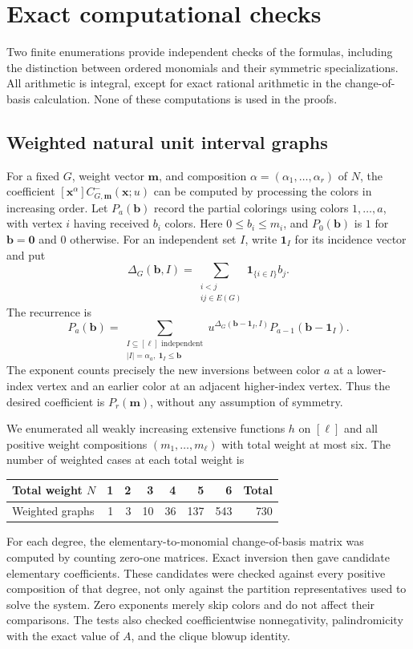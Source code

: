 \documentclass[11pt,reqno]{amsart}
\newcommand{\xx}{\mathbf x}
\newcommand{\mm}{\mathbf m}
\newcommand{\one}{\mathbf 1}
\theoremstyle{definition}
\theoremstyle{remark}
\numberwithin{equation}{section}
\begin{document}
\section{Exact computational checks}\label{app:checks}

Two finite enumerations provide independent checks of the formulas,
including the distinction between ordered monomials and their symmetric
specializations.  All arithmetic is integral, except for exact rational
arithmetic in the change-of-basis calculation.  None of these computations
is used in the proofs.

\subsection{Weighted natural unit interval graphs}
For a fixed $G$, weight vector $\mm$, and composition
$\alpha=(\alpha_1,\ldots,\alpha_r)$ of $N$, the coefficient
$[\xx^\alpha]C^-_{G,\mm}(\xx;u)$ can be computed by processing the colors
in increasing order.  Let $P_a(\mathbf b)$ record the partial colorings
using colors $1,\ldots,a$, with vertex $i$ having received $b_i$ colors.
Here $0\leq b_i\leq m_i$, and $P_0(\mathbf b)$ is $1$ for
$\mathbf b=\mathbf0$ and $0$ otherwise.  For an independent set $I$,
write $\one_I$ for its incidence vector and put
\[
 \Delta_G(\mathbf b,I)
  =\sum_{\substack{i<j\\ij\in E(G)}}\one_{\{i\in I\}}b_j.
\]
The recurrence is
\begin{equation}\label{eq:computational-recurrence}
 P_a(\mathbf b)
  =\sum_{\substack{I\subseteq[\ell]\text{ independent}\\
                   |I|=\alpha_a,\ \one_I\leq\mathbf b}}
       u^{\Delta_G(\mathbf b-\one_I,I)}
       P_{a-1}(\mathbf b-\one_I).
\end{equation}
The exponent counts precisely the new inversions between color $a$ at
a lower-index vertex and an earlier color at an adjacent higher-index
vertex.  Thus the desired coefficient is $P_r(\mm)$, without any
assumption of symmetry.

We enumerated all weakly increasing extensive functions $h$ on $[\ell]$
and all positive weight compositions $(m_1,\ldots,m_\ell)$ with total
weight at most six.  The number of weighted cases at each total weight is
\begin{center}
\begin{tabular}{lrrrrrrr}
\toprule
Total weight $N$ & 1 & 2 & 3 & 4 & 5 & 6 & Total\\
\midrule
Weighted graphs & 1 & 3 & 10 & 36 & 137 & 543 & 730\\
\bottomrule
\end{tabular}
\end{center}
For each degree, the elementary-to-monomial change-of-basis matrix was
computed by counting zero-one matrices.  Exact inversion then gave
candidate elementary coefficients.  These candidates were checked against
every positive composition of that degree, not only against the partition
representatives used to solve the system.  Zero exponents merely skip
colors and do not affect their comparisons.  The tests also checked
coefficientwise nonnegativity, palindromicity with the exact value of $A$,
and the clique blowup identity.
\end{document}
